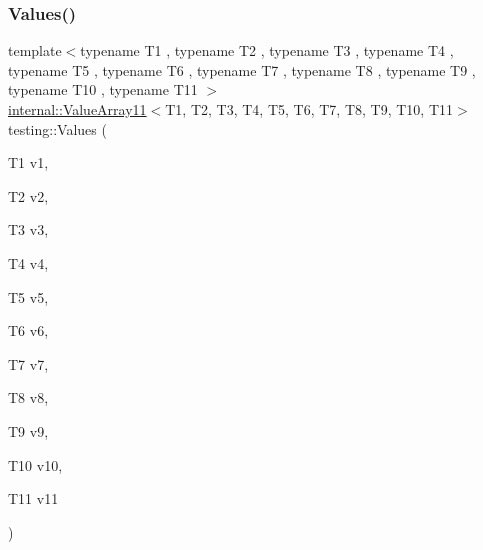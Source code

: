 \mbox{\label{namespacetesting_a4aaae77b8404038ed5f3bf56cccdb940}} 
\subsubsection{\texorpdfstring{Values()}{Values()}\hspace{0.1cm}{\footnotesize\ttfamily [11/50]}}
{\footnotesize\ttfamily template$<$typename T1 , typename T2 , typename T3 , typename T4 , typename T5 , typename T6 , typename T7 , typename T8 , typename T9 , typename T10 , typename T11 $>$ \\
\mbox{\hyperlink{classtesting_1_1internal_1_1ValueArray11}{internal\+::\+Value\+Array11}}$<$T1, T2, T3, T4, T5, T6, T7, T8, T9, T10, T11$>$ testing\+::\+Values (\begin{DoxyParamCaption}\item[{T1}]{v1,  }\item[{T2}]{v2,  }\item[{T3}]{v3,  }\item[{T4}]{v4,  }\item[{T5}]{v5,  }\item[{T6}]{v6,  }\item[{T7}]{v7,  }\item[{T8}]{v8,  }\item[{T9}]{v9,  }\item[{T10}]{v10,  }\item[{T11}]{v11 }\end{DoxyParamCaption})}

\mbox{\label{namespacetesting_a03e7f9611794732bb030c53365dc6c86}} 
